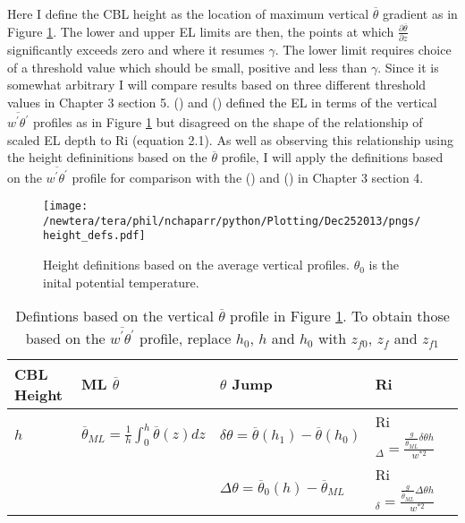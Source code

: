 Here I define the \acs{CBL} height as the location of maximum vertical $\overline{\theta}$ gradient as in Figure \ref{fig:hdefs}.  The lower and upper \acs{EL} limits are then, the points at which $\frac{\partial \overline{\theta}}{\partial z}$ significantly exceeds zero and where it resumes $\gamma$.  The lower limit requires choice of a threshold value which should be small, positive and less than $\gamma$. Since it is somewhat arbitrary I will compare results based on three different threshold values in Chapter 3 section 5.  \citeauthor{FedConzMir04} (\citeyear{FedConzMir04}) and \citeauthor{BrooksFowler2} (\citeyear{BrooksFowler2}) defined the \acs{EL} in terms of the vertical $\overline{w^{'}\theta^{'}}$ profiles as in Figure \ref{fig:hdefs} but disagreed on the shape of the relationship of scaled \acs{EL} depth to \acs{Ri} (equation 2.1).  As well as observing this relationship using the height defininitions based on the $\overline{\theta}$ profile, I will apply the definitions based on the $\overline{w^{'}\theta^{'}}$ profile for comparison with the \citeauthor{BrooksFowler2} (\citeyear{BrooksFowler2}) and \citeauthor{FedConzMir04} (\citeyear{FedConzMir04}) in Chapter 3 section 4.\\  

\begin{figure}[htbp]
    \centering
    \texttt{[image: /newtera/tera/phil/nchaparr/python/Plotting/Dec252013/pngs/height\_defs.pdf]}
    \caption{Height definitions based on the average vertical profiles. $\theta_{0}$ is the inital potential temperature.}
    \label{fig:hdefs}   %
\end{figure}

\begin{table}[htbp]
    \begin{center}
    \begin{tabular}{ p{2cm} p{4cm}  p{3cm}  p{3cm} p{3cm} }
      \acs{CBL} Height & \acs{ML} $\overline{\theta}$ & $\theta$ Jump & \acs{Ri} \\ \hline 
       $h$ & $\overline{\theta}_{ML} = \frac{1}{h}\int^{h}_{0}\overline{\theta}(z)dz$ & $\delta \theta=\overline{\theta}(h_{1})-\overline{\theta}(h_{0})$ & \acs{Ri}$_{\Delta}=\frac{\frac{g}{\overline{\theta}_{ML}}\delta \theta h}{w^{*2}}$  \\ [.3cm] %
        
       & &$\Delta \theta = \overline{\theta}_{0}(h)- \overline{\theta}_{ML}$ & \acs{Ri}$_{\delta}=\frac{\frac{g}{\overline{\theta}_{ML}} \Delta \theta h}{w^{*2}}$ \\ \hline
      \end{tabular}
\caption{Defintions based on the vertical $\overline{\theta}$ profile in Figure \ref{fig:hdefs}.  To obtain those based on the $\overline{w^{'}\theta^{'}}$ profile, replace $h_{0}$, $h$ and $h_{0}$ with $z_{f0}$, $z_{f}$ and $z_{f1}$}
\label{table:reldefs}   
\end{center}    
\end{table}

